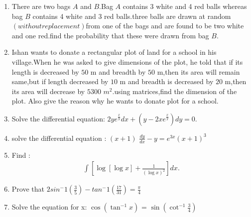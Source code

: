 \documentclass[12pt,-letter paper]{article}
\providecommand{\sbrak}[1]{\ensuremath{{}\left[#1\right]}}
\providecommand{\brak}[1]{\ensuremath{\left(#1\right)}}
\providecommand{\sbrak}[1]{\ensuremath{{}\left[#1\right]}}
\begin{document}
\begin{enumerate}
\item 
	There are two bags $A$ and $B$.Bag $A$ contains 3 white and 4 red balls whereas bag $B$ contains 4 white and 3 red balls.three balls are drawn at random $\brak{without replacement}$from one of the bags and are found to  be two white and one red.find the probability that these were drawn from bag $B$.

\item  
	Ishan wants to donate a rectangular plot of land for a school in his village.When he was asked to give dimensions of the plot, he told that if its length is decreased by $50$ m and breadth by $50$ m,then its area will remain same,but if length decreased by $10$ m and breadth is decreased by $20$ m,then its area will decrease by $5300$ $m^2$.using matrices,find the dimension of the plot. Also give the reason why he wants to donate plot for a school.

\item 
	Solve the differential equation: $2y e^{\frac{x}{y}} dx + \brak{y - 2x e^{\frac{x}{y}}} dy = 0$.
\item
	solve the differential equation : $\brak{x+1}$ $\frac{dy}{dx}-y=e^{3x}(x+1)^3$

\item 
	Find : \begin{align*}\int[\log\sbrak{\log{x}}+\frac{1}{(\log{x})^2}]dx.\end{align*}

\item 
       Prove that $2sin^-1 (\frac{3}{5})-tan^-1(\frac{17}{31})=\frac{    \pi}{4}$

\item
	Solve the equation for x: $\cos{\brak{\tan^{-1}x}}$ = $\sin\brak{{\cot^{-1}\frac{3}{4}}}$


\end{enumerate}
\end{document}

